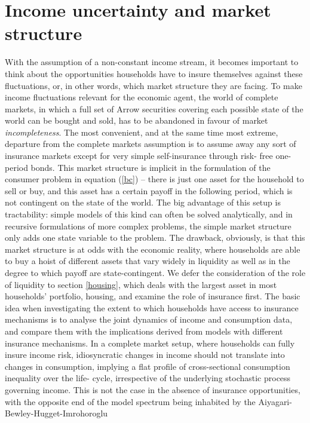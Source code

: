 \section{Income uncertainty and market structure}
With the assumption of a non-constant income stream, it becomes important to 
think about the opportunities households have to insure themselves against
these fluctuations, or, in other words, which market structure they are facing.
To make income fluctuations relevant for the economic agent, the world of 
complete markets, in which a full set of Arrow securities covering each possible
state of the world can be bought and sold, has to be abandoned in favour of 
market \textit{incompleteness}. The most convenient, and at the same time most
extreme, departure from the complete markets assumption is to assume away any
sort of insurance markets except for very simple self-insurance through risk-
free one-period bonds. This market structure is implicit in the formulation of
the consumer problem in equation (\ref{bc}) -- there is just one asset for the 
household to sell or buy, and this asset has a certain payoff in the following 
period, which is not contingent on the state of the world. The big advantage of 
this setup is tractability: simple models of this kind can often be solved 
analytically, and in recursive formulations of more complex problems, the simple
market structure only adds one state variable to the problem. The drawback, 
obviously, is that this market structure is at odds with the economic reality,
where households are able to buy a hoist of different assets that vary widely 
in liquidity as well as in the degree to which payoff are state-contingent.
We defer the consideration of the role of liquidity to section \ref{housing}, 
which deals with the largest asset in most households' portfolio, housing, and
examine the role of insurance first. The basic idea when investigating the 
extent to which households have access to insurance mechanisms is to analyse
the joint dynamics of income and consumption data, and compare them with the
implications derived from models with different insurance mechanisms. In a 
complete market setup, where households can fully insure income risk, 
idiosyncratic changes in income should not translate into changes in consumption,
implying a flat profile of cross-sectional consumption inequality over the life-
cycle, irrespective of the underlying stochastic process governing income. This 
is not the case in the absence of insurance opportunities, with the opposite 
end of the model spectrum being inhabited by the Aiyagari-Bewley-Hugget-Imrohoroglu

